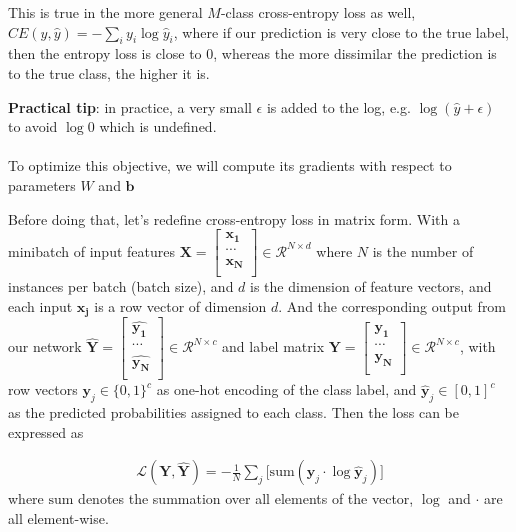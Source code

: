 This is true in the more general $M$-class cross-entropy loss as well, $CE(y, \hat{y}) = -\sum_{i} y_i \log \hat{y}_i $, where if our prediction is very close to the true label, then the entropy loss is close to 0, whereas the more dissimilar the prediction is to the true class, the higher it is.

\noindent\textbf{Practical tip}: in practice, a very small $\epsilon$ is added to the log, e.g. $\log(\hat{y}+\epsilon)$ to avoid $\log 0$ which is undefined.
\\\\
To optimize this objective, we will compute its gradients with respect to parameters $W$ and $\mathbf{b}$


Before doing that, let's redefine cross-entropy loss in matrix form. With a minibatch of input features $\mathbf{X} = \left[\begin{array}{c}
        \mathbf{x_1}\\
        \cdots\\
        \mathbf{x_N}\\
    \end{array}\right] \in \mathcal{R}^{N \times d} $ where $N$ is the number of instances per batch (batch size), and $d$ is the dimension of feature vectors, and each input $\mathbf{x_j}$ is a row vector of dimension $d$. And the corresponding output from our network $\hat{\mathbf{Y}} = \left[\begin{array}{c}
        \hat{\mathbf{y_1}}\\
        \cdots\\
        \hat{\mathbf{y_N}}\\
    \end{array}\right] \in \mathcal{R}^{N \times c}$ and label matrix $\mathbf{Y} = \left[\begin{array}{c}
        \mathbf{y_1}\\
        \cdots\\
        \mathbf{y_N}\\
    \end{array}\right] \in \mathcal{R}^{N \times c} $, with row vectors $\mathbf{y}_j \in \{0, 1\}^{c}$ as one-hot encoding of the class label, and $\hat{\mathbf{y}}_j \in [0, 1]^{c}$ as the predicted probabilities assigned to each class. Then the loss can be expressed as

\begin{align}
    \mathcal{L}(\mathbf{Y}, \hat{\mathbf{Y}}) =   - \frac{1}{N} \sum_{j} \big[ \textrm{sum}(\mathbf{y}_j  \cdot \log \hat{\mathbf{y}}_j) \big] \label{eq:ce}
\end{align}
where $\textrm{sum}$ denotes the summation over all elements of the vector, $\log$ and $\cdot$ are all element-wise.


